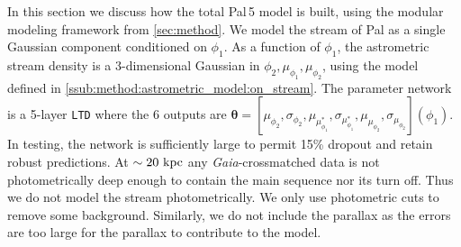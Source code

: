 \documentclass[twocolumn, linenumbers]{aastex631}
\newcommand{\stream}[1]{#1}
\newcommand{\dataarchive}[1]{\textit{#1}}
\newcommand{\Gaia}{\dataarchive{Gaia}}
\newcommand{\mbs}[1]{\boldsymbol{#1}}
\begin{document}
        In this section we discuss how the total \stream{Pal\,5} model is built,
        using the modular modeling framework from \autoref{sec:method}.  We
        model the stream of \stream{Pal} as a single Gaussian component
        conditioned on $\phi_1$. As a function of $\phi_1$, the astrometric
        stream density is a 3-dimensional Gaussian in $\phi_2, \mu_{\phi_1},
        \mu_{\phi_2}$, using the model defined in
        \autoref{ssub:method:astrometric_model:on_stream}.  The parameter
        network is a 5-layer \texttt{LTD} where the 6 outputs are $\mbs{\theta}
        = [\mu_{\phi_2}, \sigma_{\phi_2}, \mu_{\mu_{\phi_1}^*},
        \sigma_{\mu_{\phi_1}^*}, \mu_{\mu_{\phi_2}},
        \sigma_{\mu_{\phi_2}}](\phi_1)$.  In testing, the network is
        sufficiently large to permit 15\% dropout and retain robust predictions.
        At $\sim 20 \ \rm{kpc}$ any \Gaia{}-crossmatched data is not
        photometrically deep enough to contain the main sequence nor its turn
        off. Thus we do not model the stream photometrically. We only use
        photometric cuts to remove some background. Similarly, we do not include
        the parallax as the errors are too large for the parallax to contribute
        to the model.

\end{document}
